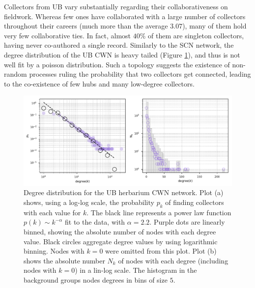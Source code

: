 Collectors from UB vary substantially regarding their collaborativeness on fieldwork.
Whereas few ones have collaborated with a large number of collectors throughout their careers (much more than the average $3.07$), many of them hold very few collaborative ties.
In fact, almost $40\%$ of them are singleton collectors, having never co-authored a single record.
%
Similarly to the SCN network, the degree distribution of the UB CWN is heavy tailed (Figure \ref{fig:ub_cwn_degree_dist}), and thus is not well fit by a poisson distribution.
Such a topology suggests the existence of non-random processes ruling the probability that two collectors get connected, leading to the co-existence of few hubs and many low-degree collectors.
\begin{figure}[!ht]
  	\centering
    \includegraphics[width=\linewidth]{figures/casestudy_ub/cwn_degree_dist.pdf}
    \caption[Degree distribution for the UB CWN.]{ Degree distribution for the UB herbarium CWN network. Plot (a) shows, using a log-log scale, the probability $p_k$ of finding collectors with each value for $k$. The black line represents a power law function $p(k) \sim k^{-\alpha}$ fit to the data, with $\alpha=2.2$. Purple dots are linearly binned, showing the absolute number of nodes with each degree value. Black circles aggregate degree values by using logarithmic binning. Nodes with $k=0$ were omitted from this plot. Plot (b) shows the absolute number $N_k$ of nodes with each degree (including nodes with $k=0$) in a lin-log scale. The histogram in the background groups nodes degrees in bins of size $5$. }
    \label{fig:ub_cwn_degree_dist}
\end{figure}


